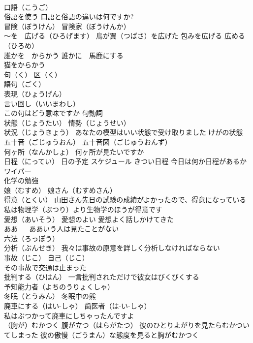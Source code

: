 \documentclass[8pt]{extreport}
\begin{document}
\begin{CJK}{UTF8}{min}
\\	口語（こうご）
\\	俗語を使う 口語と俗語の違いは何ですか?
\\	冒険（ぼうけん） 冒険家（ぼうけんか）
\\	～を　広げる（ひろげます） 鳥が翼（つばさ）を広げた 包みを広げる 広める（ひろめ）
\\	誰かを　からかう 誰かに　馬鹿にする 
\\	猫をからかう
\\	句（く） 区（く）
\\	語句（ごく）
\\	表現（ひょうげん）
\\	言い回し（いいまわし）
\\	この句はどう意味ですか 句動詞
\\	状態（じょうたい） 情勢（じょうせい） 
\\	状況（じょうきょう） あなたの模型はいい状態で受け取りました けがの状態
\\	五十音（ごじゅうおん） 五十音図（ごじゅうおんず）
\\	何ヶ所（なんかしょ） 何ヶ所が見たいですか
\\	日程（にってい） 日の予定 スケジュール きつい日程 今日は何か日程があるか
\\	ワイパー
\\	化学の勉強
\\	娘（むすめ） 娘さん（むすめさん）
\\	得意（とくい） 山田さん先日の試験の成績がよかったので、得意になっている 私は物理学（ぶつり）より生物学のほうが得意です
\\	愛想（あいそう） 愛想のよい 愛想よく話しかけてきた
\\	ああ 　 ああいう人は見たことがない
\\	六法（ろっぽう）
\\	分析（ぶんせき） 我々は事故の原意を詳しく分析しなければならない
\\	事故（じこ） 自己（じこ）
\\	その事故で交通は止まった
\\	批判する（ひはん） 一言批判されただけで彼女はびくびくする
\\	予知能力者（よちのうりょくしゃ）
\\	冬眠（とうみん） 冬眠中の熊
\\	廃車にする（はい-しゃ） 歯医者（は-い-しゃ）
\\	私はぶつかって廃車にしちゃったんですよ
\\	（胸が）むかつく 腹が立つ（はらがたつ） 彼のひとりよがりを見たらむかついてしまった 彼の傲慢（ごうまん）な態度を見ると胸がむかつく

\end{CJK}
\end{document}
